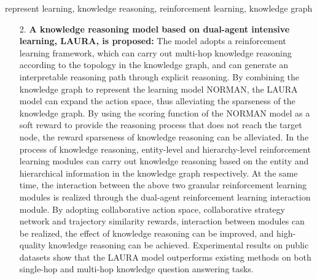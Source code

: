 \documentclass[algorithmlist, AutoFakeBold, AutoFakeSlant, figurelist, tablelist, nomlist, masters]{seuthesix}
\begin{document}
\begin{englishabstract}{represent learning, knowledge reasoning, reinforcement learning, knowledge graph}
\begin{itemize}
    Then, the causal inference module is used to construct a causal graph of the graph neural network module, and the method of causal intervention of neighborhood information is adopted to comprehensively consider a variety of factors such as hierarchical difference score, decision difference score, predictive confidence score and inference distance score to evaluate whether the current node receives information from the neighborhood nodes and improve stability of the model.
    At the same time, through the graph neural network module, the hierarchical information of the hierarchical information extraction module is used as the auxiliary, and the causal inference module is used to evaluate whether to receive neighborhood information. The completed training model can convert the input knowledge triples into the knowledge representation vectors and can be used for the task of knowledge reasoning.
    Experimental results on public datasets show that the NORMAN model outperforms existing methods on knowledge graph completion tasks.
    \item [2.]\textbf{A knowledge reasoning model based on dual-agent intensive learning, LAURA, is proposed:}
    The model adopts a reinforcement learning framework, which can carry out multi-hop knowledge reasoning according to the topology in the knowledge graph, and can generate an interpretable reasoning path through explicit reasoning.
    By combining the knowledge graph to represent the learning model NORMAN, the LAURA model can expand the action space, thus alleviating the sparseness of the knowledge graph. By using the scoring function of the NORMAN model as a soft reward to provide the reasoning process that does not reach the target node, the reward sparseness of knowledge reasoning can be alleviated.
    In the process of knowledge reasoning, entity-level and hierarchy-level reinforcement learning modules can carry out knowledge reasoning based on the entity and hierarchical information in the knowledge graph respectively.
    At the same time, the interaction between the above two granular reinforcement learning modules is realized through the dual-agent reinforcement learning interaction module. By adopting collaborative action space, collaborative strategy network and trajectory similarity rewards, interaction between modules can be realized, the effect of knowledge reasoning can be improved, and high-quality knowledge reasoning can be achieved.
    Experimental results on public datasets show that the LAURA model outperforms existing methods on both single-hop and multi-hop knowledge question answering tasks.
  \end{itemize}
\end{englishabstract} 
\end{document}
